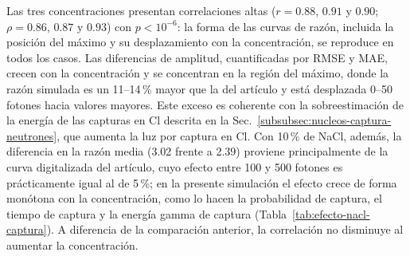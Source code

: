 Las tres concentraciones presentan correlaciones altas ($r=0.88$, $0.91$ y $0.90$; $\rho=0.86$, $0.87$ y $0.93$) con $p<10^{-6}$: la forma de las curvas de razón, incluida la posición del máximo y su desplazamiento con la concentración, se reproduce en todos los casos. Las diferencias de amplitud, cuantificadas por RMSE y MAE, crecen con la concentración y se concentran en la región del máximo, donde la razón simulada es un 11--14\,\% mayor que la del artículo y está desplazada 0--50 fotones hacia valores mayores. Este exceso es coherente con la sobreestimación de la energía de las capturas en Cl descrita en la Sec.~\ref{subsubsec:nucleos-captura-neutrones}, que aumenta la luz por captura en Cl. Con 10\,\% de NaCl, además, la diferencia en la razón media (3.02 frente a 2.39) proviene principalmente de la curva digitalizada del artículo, cuyo efecto entre 100 y 500 fotones es prácticamente igual al de 5\,\%; en la presente simulación el efecto crece de forma monótona con la concentración, como lo hacen la probabilidad de captura, el tiempo de captura y la energía gamma de captura (Tabla~\ref{tab:efecto-nacl-captura}). A diferencia de la comparación anterior, la correlación no disminuye al aumentar la concentración.

